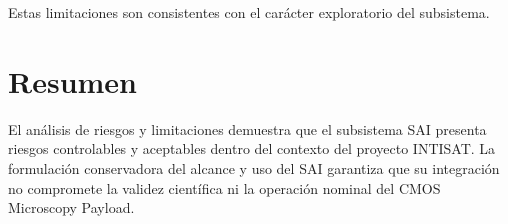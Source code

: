 Estas limitaciones son consistentes con el carácter exploratorio del subsistema.

\section{Resumen}

El análisis de riesgos y limitaciones demuestra que el subsistema SAI presenta
riesgos controlables y aceptables dentro del contexto del proyecto INTISAT. La
formulación conservadora del alcance y uso del SAI garantiza que su integración
no compromete la validez científica ni la operación nominal del CMOS Microscopy
Payload.

